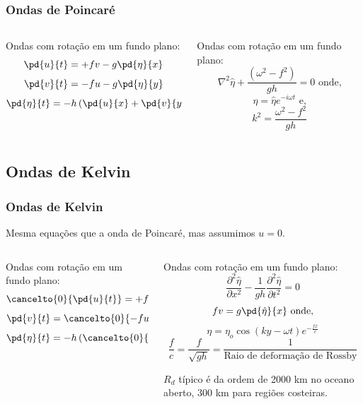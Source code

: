 \begin{frame}
\frametitle{Ondas de Poincaré}
  \begin{columns}
    \begin{column}{0.5\textwidth}
    \begin{block}{}
      Ondas com rotação em um fundo plano:
      \[\pd{u}{t} = +fv -g\pd{\eta}{x}\]
      \[\pd{v}{t} = -fu -g\pd{\eta}{y}\]
      \[\pd{\eta}{t} = -h\left(\pd{u}{x} + \pd{v}{y}\right)\]
    \end{block}
    \end{column}
    \begin{column}{0.5\textwidth}
    \begin{block}{}
      Ondas com rotação em um fundo plano:
      \[\nabla^2\hat{\eta} + \frac{(\omega^2 - f^2)}{gh} = 0\text{ onde,}\]
      \[\eta = \hat{\eta}e^{-i\omega t} \text{ e,}\]
      \[k^2 = \frac{\omega^2 - f^2}{gh}\]
    \end{block}
    \end{column}
  \end{columns}
\end{frame}

\subsection{Ondas de Kelvin}
\begin{frame}
\frametitle{Ondas de Kelvin}
{\scriptsize
  Mesma equações que a onda de Poincaré, mas assumimos $u=0$.
  \begin{columns}
    \begin{column}{0.5\textwidth}
    \begin{block}{}
      Ondas com rotação em um fundo plano:
      \[\cancelto{0}{\pd{u}{t}} = +fv -g\pd{\eta}{x}\]
      \[\pd{v}{t} = \cancelto{0}{-fu} -g\pd{\eta}{y}\]
      \[\pd{\eta}{t} = -h\left(\cancelto{0}{\pd{u}{x}} + \pd{v}{y}\right)\]
    \end{block}
    \end{column}
    \begin{column}{0.5\textwidth}
    \begin{block}{}
      Ondas com rotação em um fundo plano:
      \[\frac{\partial^2\hat{\eta}}{\partial x^2} - \frac{1}{gh}\frac{\partial^2\hat{\eta}}{\partial{t^2}} = 0\]
      \[fv = g\pd{\hat{\eta}}{x} \text{ onde,}\]
      \[\eta = \eta_o\cos(ky - \omega t)e^{-\frac{fx}{c}}\]
      \[\frac{f}{c} = \frac{f}{\sqrt{gh}} = \frac{1}{\text{Raio de deformação de Rossby}}\]
    \end{block}
    $R_d$ típico é da ordem de 2000 km no oceano aberto, 300 km para regiões
    costeiras.
    \end{column}
  \end{columns}
}
\end{frame}

